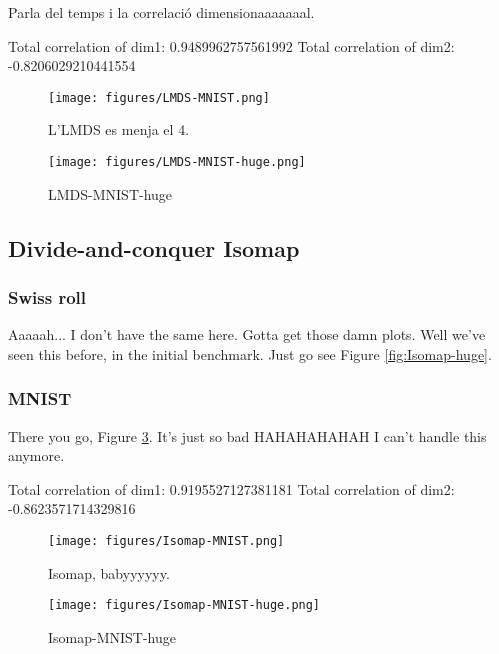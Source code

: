 Parla del temps i la correlació dimensionaaaaaaal.

Total correlation of dim1: 0.9489962757561992
Total correlation of dim2: -0.8206029210441554

\begin{figure}[ht]
    \centering
    \texttt{[image: figures/LMDS-MNIST.png]}
    \caption{L'LMDS es menja el 4.}
    \label{fig:LMDS-MNIST}
\end{figure}

\begin{figure}[ht]
    \centering
    \texttt{[image: figures/LMDS-MNIST-huge.png]}
    \caption{LMDS-MNIST-huge}
    \label{fig:LMDS-MNIST-huge}
\end{figure}

\subsection{Divide-and-conquer Isomap}

\subsubsection{Swiss roll}

Aaaaah... I don't have the same here. Gotta get those damn plots. Well we've seen this before, in the initial benchmark. Just go see Figure \ref{fig:Isomap-huge}.

\subsubsection{MNIST}

There you go, Figure \ref{fig:Isomap-MNIST}. It's just so bad HAHAHAHAHAH I can't handle this anymore.

Total correlation of dim1: 0.9195527127381181
Total correlation of dim2: -0.8623571714329816

\begin{figure}[ht]
    \centering
    \texttt{[image: figures/Isomap-MNIST.png]}
    \caption{Isomap, babyyyyyy.}
    \label{fig:Isomap-MNIST}
\end{figure}

\begin{figure}[ht]
    \centering
    \texttt{[image: figures/Isomap-MNIST-huge.png]}
    \caption{Isomap-MNIST-huge}
    \label{fig:Isomap-MNIST-huge}
\end{figure}

